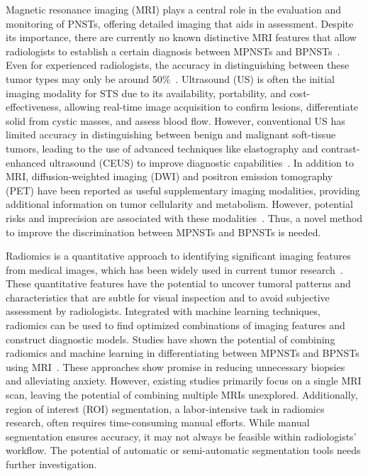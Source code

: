 Magnetic resonance imaging (MRI) plays a central role in the evaluation and monitoring of PNSTs, offering detailed imaging that aids in assessment.
Despite its importance, there are currently no known distinctive MRI features that allow radiologists to establish a certain diagnosis between MPNSTs and BPNSTs~\autocite{martin2021}.
Even for experienced radiologists, the accuracy in distinguishing between these tumor types may only be around 50\%~\autocite{vos2019,karsy2016}.
Ultrasound (US) is often the initial imaging modality for STS due to its availability, portability, and cost-effectiveness, allowing real-time image acquisition to confirm lesions, differentiate solid from cystic masses, and assess blood flow.
However, conventional US has limited accuracy in distinguishing between benign and malignant soft-tissue tumors, leading to the use of advanced techniques like elastography and contrast-enhanced ultrasound (CEUS) to improve diagnostic capabilities~\autocite{wu2022}.
In addition to MRI, diffusion-weighted imaging (DWI) and positron emission tomography (PET) have been reported as useful supplementary imaging modalities, providing additional information on tumor cellularity and metabolism.
However, potential risks and imprecision are associated with these modalities~\autocite{martin2021,brinkman2018,derlin2013,reinert2019}.
Thus, a novel method to improve the discrimination between MPNSTs and BPNSTs is needed.

Radiomics is a quantitative approach to identifying significant imaging features from medical images, which has been widely used in current tumor research~\autocite{vos2019,peeken2019ct,peeken2019mri,wang2020,ly2023,zhang2021}.
These quantitative features have the potential to uncover tumoral patterns and characteristics that are subtle for visual inspection and to avoid subjective assessment by radiologists.
Integrated with machine learning techniques, radiomics can be used to find optimized combinations of imaging features and construct diagnostic models.
Studies have shown the potential of combining radiomics and machine learning in differentiating between MPNSTs and BPNSTs using MRI~\autocite{zhang2021,ristow2022}.
These approaches show promise in reducing unnecessary biopsies and alleviating anxiety.
However, existing studies primarily focus on a single MRI scan, leaving the potential of combining multiple MRIs unexplored.
Additionally, region of interest (ROI) segmentation, a labor-intensive task in radiomics research, often requires time-consuming manual efforts.
While manual segmentation ensures accuracy, it may not always be feasible within radiologists' workflow.
The potential of automatic or semi-automatic segmentation tools needs further investigation.

